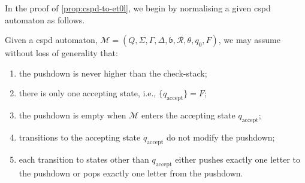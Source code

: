 In the proof of \cref{prop:cspd-to-et0l}, we begin by normalising a given cspd automaton as follows.

\begin{lemma}\label{lemma:cspd-model-restrictions}
	Given a cspd automaton, $\mathcal{M} = (Q, \Sigma, \Gamma, \Delta, \mathfrak{b}, \mathcal{R}, \theta, q_0, F)$, we may assume without loss of generality that:
	\begin{enumerate}
		\item the pushdown is never higher than the check-stack;
		\item there is only one accepting state, i.e., $\{q_\mathrm{accept}\} = F$;
		\item the pushdown is empty when $\mathcal{M}$ enters the accepting state $q_\mathrm{accept}$;
		\item transitions to the accepting state $q_\mathrm{accept}$ do not modify the pushdown;
		\item each transition to states other than $q_\mathrm{accept}$ either pushes exactly one letter to the pushdown or pops exactly one letter from the pushdown.
	\end{enumerate}
\end{lemma}

